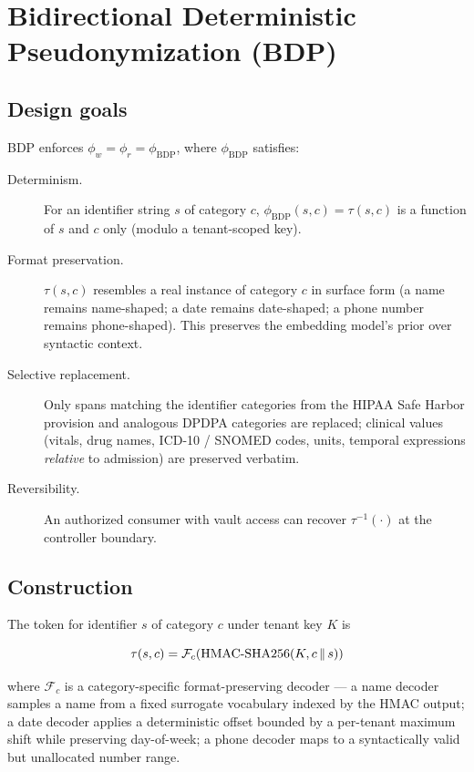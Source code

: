 \documentclass[11pt,a4paper]{article}
\begin{document}
\section{Bidirectional Deterministic Pseudonymization (BDP)}
\label{sec:bdp}

\subsection{Design goals}

BDP enforces $\phi_w = \phi_r = \phi_\text{BDP}$, where $\phi_\text{BDP}$
satisfies:

\begin{description}
  \item[Determinism.] For an identifier string $s$ of category $c$,
        $\phi_\text{BDP}(s, c) = \tau(s, c)$ is a function of $s$ and $c$
        only (modulo a tenant-scoped key).
  \item[Format preservation.] $\tau(s, c)$ resembles a real instance of
        category $c$ in surface form (a name remains name-shaped; a date
        remains date-shaped; a phone number remains phone-shaped). This
        preserves the embedding model's prior over syntactic context.
  \item[Selective replacement.] Only spans matching the identifier
        categories from the HIPAA Safe Harbor provision and analogous
        DPDPA categories are replaced; clinical values (vitals, drug names,
        ICD-10 / SNOMED codes, units, temporal expressions \emph{relative}
        to admission) are preserved verbatim.
  \item[Reversibility.] An authorized consumer with vault access can recover
        $\tau^{-1}(\cdot)$ at the controller boundary.
\end{description}

\subsection{Construction}

The token for identifier $s$ of category $c$ under tenant key $K$ is

\[
\tau(s, c) = \mathcal{F}_c\!\left( \mathrm{HMAC\textnormal{-}SHA256}(K, c \,\Vert\, s) \right)
\]

where $\mathcal{F}_c$ is a category-specific format-preserving decoder ---
a name decoder samples a name from a fixed surrogate vocabulary indexed by
the HMAC output; a date decoder applies a deterministic offset bounded by a
per-tenant maximum shift while preserving day-of-week; a phone decoder maps
to a syntactically valid but unallocated number range.
\end{document}

